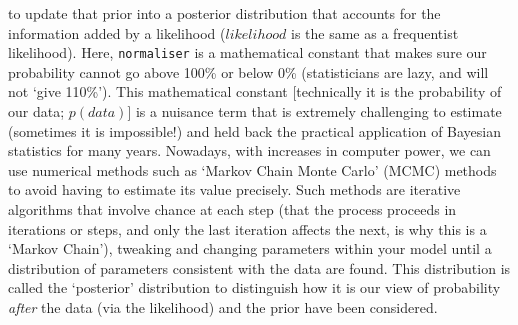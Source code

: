 \documentclass[11pt]{article}
\begin{document}
to update that prior into a posterior distribution that accounts for the information added by a likelihood ($likelihood$ is the same as a frequentist likelihood). Here, \texttt{normaliser} is a mathematical constant that makes sure our probability cannot go above 100\% or below 0\% (statisticians are lazy, and will not `give 110\%'). This mathematical constant [technically it is the probability of our data; $p(data)$] is a nuisance term that is extremely challenging to estimate (sometimes it is impossible!) and held back the practical application of Bayesian statistics for many years. Nowadays, with increases in computer power, we can use numerical methods such as `Markov Chain Monte Carlo' (MCMC) methods to avoid having to estimate its value precisely. Such methods are iterative algorithms  that involve chance at each step (that the process proceeds in iterations or steps, and only the last iteration affects the next, is why this is a `Markov Chain'), tweaking and changing parameters within your model until a distribution of parameters consistent with the data are found. This distribution is called the `posterior' distribution to distinguish how it is our view of probability \emph{after} the data (via the likelihood) and the prior have been considered. %


\end{document}
